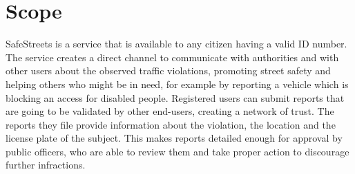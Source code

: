 \section{Scope}
SafeStreets is a service that is available to any citizen having a valid ID number.
The service creates a direct channel to communicate with authorities and with other users about the observed traffic violations, promoting street safety and
helping others who might be in need, for example by reporting a vehicle which is blocking an access for disabled people.
Registered users can submit reports that are going to be validated by other end-users, creating a network of trust.
The reports they file provide information about the violation, the location and the license plate of the subject. This makes reports detailed enough for
approval by public officers, who are able to review them and take proper action to discourage further infractions.